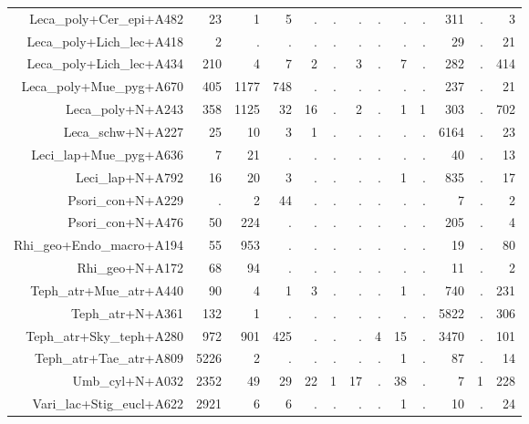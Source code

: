 \documentclass[a4paper, 11]{article}\usepackage[]{graphicx}\usepackage[]{color}
\begin{document}
\begin{table}
\begin{tabular}{rrrrrrrrrrrrr}
  Leca\_poly+Cer\_epi+A482 & 23 & 1 & 5 & . & . & . & . & . & . & 311 & . & 3 \\ 
  Leca\_poly+Lich\_lec+A418 & 2 & . & . & . & . & . & . & . & . & 29 & . & 21 \\ 
  Leca\_poly+Lich\_lec+A434 & 210 & 4 & 7 & 2 & . & 3 & . & 7 & . & 282 & . & 414 \\ 
  Leca\_poly+Mue\_pyg+A670 & 405 & 1177 & 748 & . & . & . & . & . & . & 237 & . & 21 \\ 
  Leca\_poly+N+A243 & 358 & 1125 & 32 & 16 & . & 2 & . & 1 & 1 & 303 & . & 702 \\ 
  Leca\_schw+N+A227 & 25 & 10 & 3 & 1 & . & . & . & . & . & 6164 & . & 23 \\ 
  Leci\_lap+Mue\_pyg+A636 & 7 & 21 & . & . & . & . & . & . & . & 40 & . & 13 \\ 
  Leci\_lap+N+A792 & 16 & 20 & 3 & . & . & . & . & 1 & . & 835 & . & 17 \\ 
  Psori\_con+N+A229 & . & 2 & 44 & . & . & . & . & . & . & 7 & . & 2 \\ 
  Psori\_con+N+A476 & 50 & 224 & . & . & . & . & . & . & . & 205 & . & 4 \\ 
  Rhi\_geo+Endo\_macro+A194 & 55 & 953 & . & . & . & . & . & . & . & 19 & . & 80 \\ 
  Rhi\_geo+N+A172 & 68 & 94 & . & . & . & . & . & . & . & 11 & . & 2 \\ 
  Teph\_atr+Mue\_atr+A440 & 90 & 4 & 1 & 3 & . & . & . & 1 & . & 740 & . & 231 \\ 
  Teph\_atr+N+A361 & 132 & 1 & . & . & . & . & . & . & . & 5822 & . & 306 \\ 
  Teph\_atr+Sky\_teph+A280 & 972 & 901 & 425 & . & . & . & 4 & 15 & . & 3470 & . & 101 \\ 
  Teph\_atr+Tae\_atr+A809 & 5226 & 2 & . & . & . & . & . & 1 & . & 87 & . & 14 \\ 
  Umb\_cyl+N+A032 & 2352 & 49 & 29 & 22 & 1 & 17 & . & 38 & . & 7 & 1 & 228 \\ 
  Vari\_lac+Stig\_eucl+A622 & 2921 & 6 & 6 & . & . & . & . & 1 & . & 10 & . & 24 \\ 
   \hline
\end{tabular}
\end{table}
\end{document}
